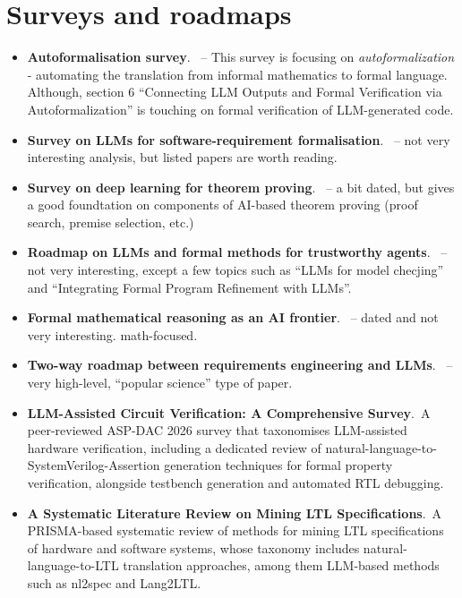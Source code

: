 \documentclass[natbib=false,acmsmall,nonacm,11pt]{acmart}
\begin{document}
\section{Surveys and roadmaps}\label{sec:surveys-roadmaps}
\begin{itemize}
\item \textbf{Autoformalisation survey}.~\cite{DBLP:journals/corr/abs-2505-23486} -- This survey is focusing on \textit{autoformalization} - automating the translation from informal mathematics to formal language. Although, section 6 ``Connecting LLM Outputs and Formal Verification via Autoformalization'' is touching on formal verification of LLM-generated code.
\item \textbf{Survey on LLMs for software-requirement formalisation}.~\cite{DBLP:journals/corr/abs-2506-11874} -- not very interesting analysis, but listed papers are worth reading.
\item \textbf{Survey on deep learning for theorem proving}.~\cite{DBLP:journals/corr/abs-2404-09939} --  a bit dated, but gives a good foundtation on components of AI-based theorem proving (proof search, premise selection, etc.)
\item \textbf{Roadmap on LLMs and formal methods for trustworthy agents}.~\cite{DBLP:journals/corr/abs-2412-06512} -- not very interesting, except a few topics such as ``LLMs for model checjing'' and ``Integrating Formal Program Refinement with LLMs''.
\item \textbf{Formal mathematical reasoning as an AI frontier}.~\cite{DBLP:conf/icml/YangPHLLCS25} -- dated and not very interesting. math-focused.
\item \textbf{Two-way roadmap between requirements engineering and LLMs}.~\cite{DBLP:journals/infsof/FerrariS25} -- very high-level, ``popular science'' type of paper.
\item \textbf{LLM-Assisted Circuit Verification: A Comprehensive Survey}.~A peer-reviewed ASP-DAC 2026 survey that taxonomises LLM-assisted hardware verification, including a dedicated review of natural-language-to-SystemVerilog-Assertion generation techniques for formal property verification, alongside testbench generation and automated RTL debugging.~\cite{Liu_2026}
\item \textbf{A Systematic Literature Review on Mining LTL Specifications}.~A PRISMA-based systematic review of methods for mining LTL specifications of hardware and software systems, whose taxonomy includes natural-language-to-LTL translation approaches, among them LLM-based methods such as nl2spec and Lang2LTL.~\cite{DBLP:journals/access/GerminianiNP25}
\end{itemize}
\end{document}
